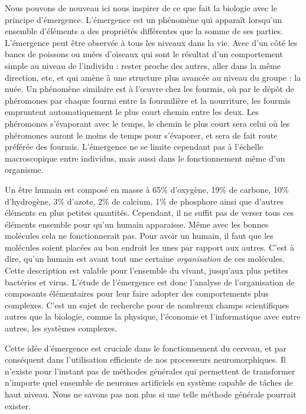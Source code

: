 	Nous pouvons de nouveau ici nous inspirer de ce que fait la biologie avec le principe d'émergence. L'émergence est un phénomène qui apparaît lorsqu'un ensemble d'éléments a des propriétés différentes que la somme de ses parties. L'émergence peut être observée à tous les niveaux dans la vie. Avec d'un côté les bancs de poissons ou nuées d'oiseaux qui sont le résultat d'un comportement simple au niveau de l'individu : rester proche des autres, aller dans la même direction, etc, et qui amène à une structure plus avancée au niveau du groupe : la nuée. Un phénomène similaire est à l'œuvre chez les fourmis, où par le dépôt de phéromones par chaque fourmi entre la fourmilière et la nourriture, les fourmis empruntent automatiquement le plus court chemin entre les deux. Les phéromones s'évaporant avec le temps, le chemin le plus court sera celui où les phéromones auront le moins de temps pour s'évaporer, et sera de fait route préférée des fourmis. L'émergence ne se limite cependant pas à l'échelle macroscopique entre individus, mais aussi dans le fonctionnement même d'un organisme.

	Un être humain est composé en masse à 65\% d'oxygène, 19\% de carbone, 10\% d'hydrogène, 3\% d'azote, 2\% de calcium, 1\% de phosphore ainsi que d'autres éléments en plus petites quantités. Cependant, il ne suffit pas de verser tous ces éléments ensemble pour qu'un humain apparaisse. Même avec les bonnes molécules cela ne fonctionnerait pas. Pour avoir un humain, il faut que les molécules soient placées au bon endroit les unes par rapport aux autres. C'est à dire, qu'un humain est avant tout une certaine \textit{organisation} de ces molécules. Cette description est valable pour l'ensemble du vivant, jusqu'aux plus petites bactéries et virus. L'étude de l'émergence est donc l'analyse de l'organisation de composants élémentaires pour leur faire adopter des comportements plus complexes. C'est un sujet de recherche pour de nombreux champs scientifiques autres que la biologie, comme la physique, l'économie et l'informatique avec entre autres, les systèmes complexes.

	Cette idée d'émergence est cruciale dans le fonctionnement du cerveau, et par conséquent dans l'utilisation efficiente de nos processeurs neuromorphiques. Il n'existe pour l'instant pas de méthodes générales qui permettent de transformer n'importe quel ensemble de neurones artificiels en système capable de tâches de haut niveau. Nous ne savons pas non plus si une telle méthode générale pourrait exister.

